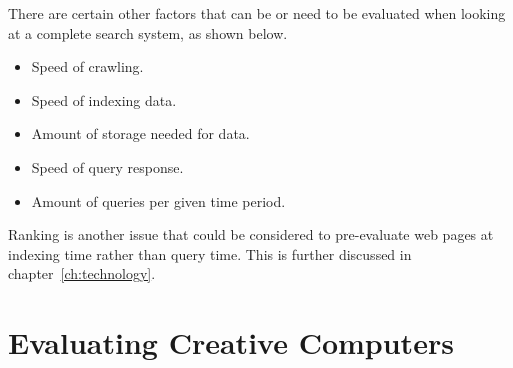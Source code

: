 There are certain other factors that can be or need to be evaluated when looking at a complete search system, as shown below.

\begin{itemize}
  \item Speed of crawling.
  \item Speed of indexing data.
  \item Amount of storage needed for data.
  \item Speed of query response.
  \item Amount of queries per given time period.
\end{itemize}

Ranking is another issue that could be considered to pre-evaluate web pages at indexing time rather than query time. This is further discussed in chapter~\ref{ch:technology}.






\section{Evaluating Creative Computers}
\label{s:creattributes}


